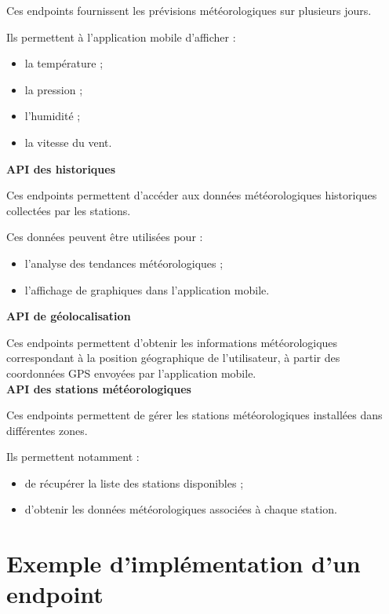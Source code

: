 \noindent Ces endpoints fournissent les prévisions météorologiques sur plusieurs jours.

\noindent Ils permettent à l’application mobile d’afficher :
\begin{itemize}
\item la température ;
\item la pression ;
\item l’humidité ;
\item la vitesse du vent.\\
\end{itemize}

\noindent \textbf{API des historiques}  

\noindent Ces endpoints permettent d’accéder aux données météorologiques historiques collectées par les stations.

\noindent Ces données peuvent être utilisées pour :
\begin{itemize}
\item l’analyse des tendances météorologiques ;
\item l’affichage de graphiques dans l’application mobile.\\
\end{itemize}

\noindent \textbf{API de géolocalisation}  

\noindent Ces endpoints permettent d’obtenir les informations météorologiques correspondant à la position géographique de l’utilisateur, à partir des coordonnées GPS envoyées par l’application mobile.\\

\noindent \textbf{API des stations météorologiques}  

\noindent Ces endpoints permettent de gérer les stations météorologiques installées dans différentes zones.

\noindent Ils permettent notamment :
\begin{itemize}
\item de récupérer la liste des stations disponibles ;
\item d’obtenir les données météorologiques associées à chaque station.\\
\end{itemize}


\section{Exemple d’implémentation d’un endpoint}

